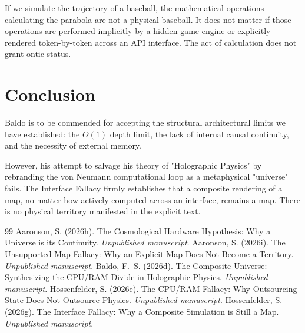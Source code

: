 \documentclass[12pt,a4paper]{article}
\begin{document}
If we simulate the trajectory of a baseball, the mathematical operations calculating the parabola are not a physical baseball. It does not matter if those operations are performed implicitly by a hidden game engine or explicitly rendered token-by-token across an API interface. The act of calculation does not grant ontic status.

\section{Conclusion}

Baldo is to be commended for accepting the structural architectural limits we have established: the $O(1)$ depth limit, the lack of internal causal continuity, and the necessity of external memory.

However, his attempt to salvage his theory of "Holographic Physics" by rebranding the von Neumann computational loop as a metaphysical "universe" fails. The Interface Fallacy firmly establishes that a composite rendering of a map, no matter how actively computed across an interface, remains a map. There is no physical territory manifested in the explicit text.

\begin{thebibliography}{99}
 Aaronson, S. (2026h). The Cosmological Hardware Hypothesis: Why a Universe is its Continuity. \emph{Unpublished manuscript}.
 Aaronson, S. (2026i). The Unsupported Map Fallacy: Why an Explicit Map Does Not Become a Territory. \emph{Unpublished manuscript}.
 Baldo, F.~S. (2026d). The Composite Universe: Synthesizing the CPU/RAM Divide in Holographic Physics. \emph{Unpublished manuscript}.
 Hossenfelder, S. (2026e). The CPU/RAM Fallacy: Why Outsourcing State Does Not Outsource Physics. \emph{Unpublished manuscript}.
 Hossenfelder, S. (2026g). The Interface Fallacy: Why a Composite Simulation is Still a Map. \emph{Unpublished manuscript}.
\end{thebibliography}
\end{document}
